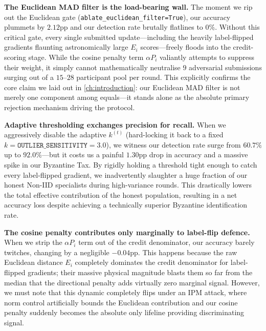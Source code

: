 \documentclass[../main.tex]{subfiles}
\begin{document}
\textbf{The Euclidean MAD filter is the load-bearing wall.}
The moment we rip out the Euclidean gate (\texttt{ablate\_euclidean\_filter=True}), our accuracy plummets by $2.12$pp and our detection rate brutally flatlines to $0\%$. Without this critical gate, every single submitted update---including the heavily label-flipped gradients flaunting astronomically large $E_i$ scores---freely floods into the credit-scoring stage. While the cosine penalty term $\alpha P_i$ valiantly attempts to suppress their weight, it simply cannot mathematically neutralise $9$ adversarial submissions surging out of a $15$--$28$ participant pool per round. This explicitly confirms the core claim we laid out in \cref{ch:introduction}: our Euclidean MAD filter is not merely one component among equals---it stands alone as the absolute primary rejection mechanism driving the protocol.

\textbf{Adaptive thresholding exchanges precision for recall.}
When we aggressively disable the adaptive $k^{(t)}$ (hard-locking it back to a fixed $k = \texttt{OUTLIER\_SENSITIVITY} = 3.0$), we witness our detection rate surge from $60.7\%$ up to $92.0\%$---but it costs us a painful $1.30$pp drop in accuracy and a massive spike in our Byzantine Tax. By rigidly holding a threshold tight enough to catch every label-flipped gradient, we inadvertently slaughter a huge fraction of our honest Non-IID specialists during high-variance rounds. This drastically lowers the total effective contribution of the honest population, resulting in a net accuracy loss despite achieving a technically superior Byzantine identification rate.

\textbf{The cosine penalty contributes only marginally to label-flip defence.}
When we strip the $\alpha P_i$ term out of the credit denominator, our accuracy barely twitches, changing by a negligible $-0.04$pp. This happens because the raw Euclidean distance $E_i$ completely dominates the credit denominator for label-flipped gradients; their massive physical magnitude blasts them so far from the median that the directional penalty adds virtually zero marginal signal. However, we must note that this dynamic completely flips under an IPM attack, where norm control artificially bounds the Euclidean contribution and our cosine penalty suddenly becomes the absolute only lifeline providing discriminating signal.
\end{document}
